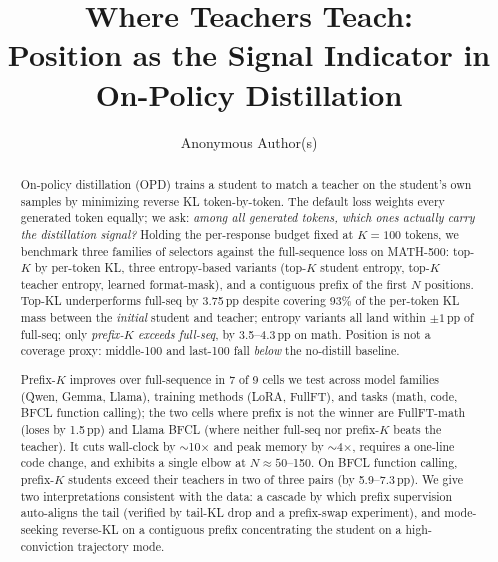 \documentclass[10pt]{article}
\title{Where Teachers Teach:\\Position as the Signal Indicator in On-Policy Distillation}
\author{Anonymous Author(s)}
\begin{document}
\maketitle

\begin{abstract}
On-policy distillation (OPD) trains a student to match a teacher on the student's own samples by minimizing reverse KL token-by-token. The default loss weights every generated token equally; we ask: \emph{among all generated tokens, which ones actually carry the distillation signal?} Holding the per-response budget fixed at $K{=}100$ tokens, we benchmark three families of selectors against the full-sequence loss on MATH-500: top-$K$ by per-token KL, three entropy-based variants (top-$K$ student entropy, top-$K$ teacher entropy, learned format-mask), and a contiguous prefix of the first $N$ positions. Top-KL underperforms full-seq by 3.75\,pp despite covering 93\% of the per-token KL mass between the \emph{initial} student and teacher; entropy variants all land within $\pm 1$\,pp of full-seq; only \emph{prefix-$K$ exceeds full-seq}, by 3.5--4.3\,pp on math. Position is not a coverage proxy: middle-100 and last-100 fall \emph{below} the no-distill baseline.

Prefix-$K$ improves over full-sequence in 7 of 9 cells we test across model families (Qwen, Gemma, Llama), training methods (LoRA, FullFT), and tasks (math, code, BFCL function calling); the two cells where prefix is not the winner are FullFT-math (loses by 1.5\,pp) and Llama BFCL (where neither full-seq nor prefix-$K$ beats the teacher). It cuts wall-clock by $\sim$10$\times$ and peak memory by $\sim$4$\times$, requires a one-line code change, and exhibits a single elbow at $N \approx 50$--150. On BFCL function calling, prefix-$K$ students exceed their teachers in two of three pairs (by 5.9--7.3\,pp). We give two interpretations consistent with the data: a cascade by which prefix supervision auto-aligns the tail (verified by tail-KL drop and a prefix-swap experiment), and mode-seeking reverse-KL on a contiguous prefix concentrating the student on a high-conviction trajectory mode.
\end{abstract}

\end{document}
